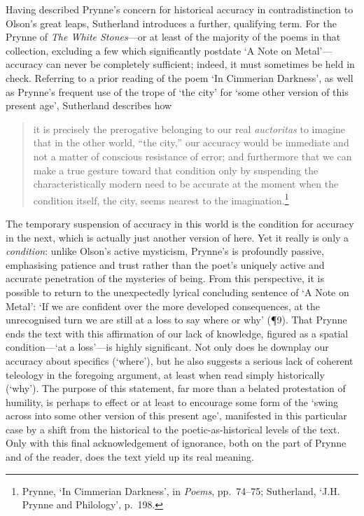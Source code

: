 \documentclass[]{article}
\begin{document}
Having described Prynne's concern for historical accuracy in
contradistinction to Olson's great leaps, Sutherland introduces a
further, qualifying term. For the Prynne of \emph{The White Stones}---or
at least of the majority of the poems in that collection, excluding a
few which significantly postdate `A Note on Metal'---accuracy can never
be completely sufficient; indeed, it must sometimes be held in check.
Referring to a prior reading of the poem `In Cimmerian Darkness', as
well as Prynne's frequent use of the trope of `the city' for `some other
version of this \textbar{} present age', Sutherland describes how

\begin{quote}
it is precisely the prerogative belonging to our real \emph{auctoritas}
to imagine that in the other world, ``the city,'' our accuracy would be
immediate and not a matter of conscious resistance of error; and
furthermore that we can make a true gesture toward that condition only
by suspending the characteristically modern need to be accurate at the
moment when the condition itself, the city, seems nearest to the
imagination.\footnote{Prynne, `In Cimmerian Darkness', in \emph{Poems},
  pp.~74--75; Sutherland, `J.H. Prynne and Philology', p.~198.}
\end{quote}

The temporary suspension of accuracy in this world is the condition for
accuracy in the next, which is actually just another version of here.
Yet it really is only a \emph{condition}: unlike Olson's active
mysticism, Prynne's is profoundly passive, emphasising patience and
trust rather than the poet's uniquely active and accurate penetration of
the mysteries of being. From this perspective, it is possible to return
to the unexpectedly lyrical concluding sentence of `A Note on Metal':
`If we are confident over the more developed consequences, at the
unrecognised turn we are still at a loss to say where or why' (¶9). That
Prynne ends the text with this affirmation of our lack of knowledge,
figured as a spatial condition---`at a loss'---is highly significant.
Not only does he downplay our accuracy about specifics (`where'), but he
also suggests a serious lack of coherent teleology in the foregoing
argument, at least when read simply historically (`why'). The purpose of
this statement, far more than a belated protestation of humility, is
perhaps to effect or at least to encourage some form of the `swing
across into \textbar{} some other version of this \textbar{} present
age', manifested in this particular case by a shift from the historical
to the poetic-as-historical levels of the text. Only with this final
acknowledgement of ignorance, both on the part of Prynne and of the
reader, does the text yield up its real meaning. \newpage
\end{document}
